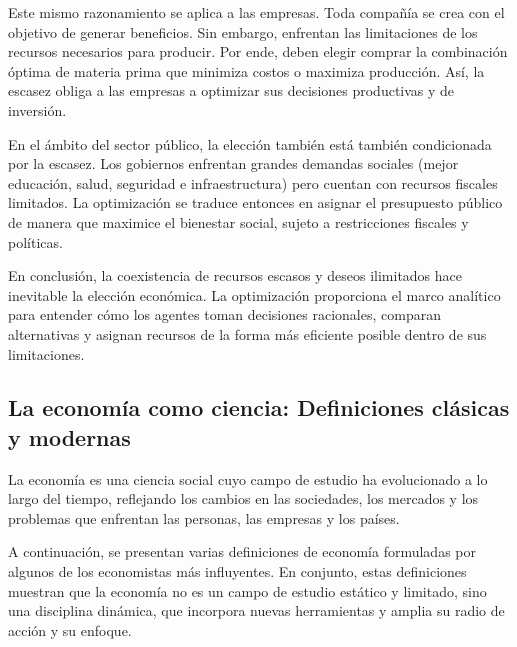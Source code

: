 \documentclass[
  letterpaper,
  DIV=11,
  numbers=noendperiod,
  oneside]{scrreprt}
\begin{document}
Este mismo razonamiento se aplica a las empresas. Toda compañía se crea
con el objetivo de generar beneficios. Sin embargo, enfrentan las
limitaciones de los recursos necesarios para producir. Por ende, deben
elegir comprar la combinación óptima de materia prima que minimiza
costos o maximiza producción. Así, la escasez obliga a las empresas a
optimizar sus decisiones productivas y de inversión.

En el ámbito del sector público, la elección también está también
condicionada por la escasez. Los gobiernos enfrentan grandes demandas
sociales (mejor educación, salud, seguridad e infraestructura) pero
cuentan con recursos fiscales limitados. La optimización se traduce
entonces en asignar el presupuesto público de manera que maximice el
bienestar social, sujeto a restricciones fiscales y políticas.

En conclusión, la coexistencia de recursos escasos y deseos ilimitados
hace inevitable la elección económica. La optimización proporciona el
marco analítico para entender cómo los agentes toman decisiones
racionales, comparan alternativas y asignan recursos de la forma más
eficiente posible dentro de sus limitaciones.

\subsection{La economía como ciencia: Definiciones clásicas y
modernas}\label{la-economuxeda-como-ciencia-definiciones-cluxe1sicas-y-modernas}

La economía es una ciencia social cuyo campo de estudio ha evolucionado
a lo largo del tiempo, reflejando los cambios en las sociedades, los
mercados y los problemas que enfrentan las personas, las empresas y los
países.

A continuación, se presentan varias definiciones de economía formuladas
por algunos de los economistas más influyentes. En conjunto, estas
definiciones muestran que la economía no es un campo de estudio estático
y limitado, sino una disciplina dinámica, que incorpora nuevas
herramientas y amplia su radio de acción y su enfoque.
\end{document}
